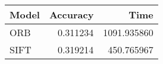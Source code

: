 \begin{tabular}{lrr}
\toprule
Model & Accuracy & Time \\
\midrule
ORB & 0.311234 & 1091.935860 \\
SIFT & 0.319214 & 450.765967 \\
\bottomrule
\end{tabular}
